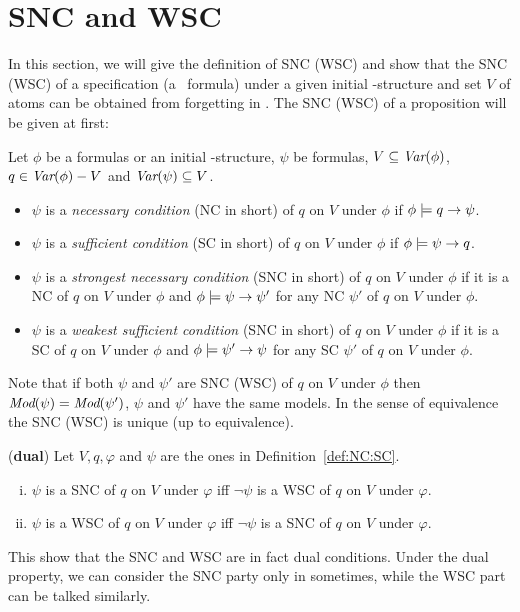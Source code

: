 \documentclass{article}
\begin{document}
\section{SNC and WSC}
In this section, we will give the definition of SNC (WSC) and show that the SNC (WSC) of a specification (a \CTL\ formula) under a given initial \MPK-structure and set $V$ of atoms can be obtained from forgetting in \CTL.
The SNC (WSC) of a proposition will be given at first:
\begin{definition}\label{def:NC:SC}
Let $\phi$ be a formulas or an initial \MPK-structure, $\psi$ be formulas, $V \subseteq \textit{Var}(\phi)$, $q\in\textit{Var}(\phi)-V$
and $\textit{Var}(\psi)\subseteq V$.
\begin{itemize}
  \item $\psi$  is a {\em necessary condition} (NC in short) of $q$ on $V$ under $\phi$
    if $\phi \models q \rightarrow \psi$.
  \item $\psi$  is a {\em sufficient condition} (SC in short) of $q$ on $V$ under $\phi$
    if $\phi \models \psi\rightarrow q$.
  \item $\psi$  is a {\em strongest necessary condition} (SNC in short)
  of $q$ on $V$ under $\phi$
    if it is a NC of $q$ on $V$ under $\phi$ and $\phi\models\psi\rightarrow\psi'$
    for any NC $\psi'$ of $q$ on $V$ under $\phi$.

    \item $\psi$  is a {\em weakest sufficient condition} (SNC in short)
  of $q$ on $V$ under $\phi$
    if it is a SC of $q$ on $V$ under $\phi$ and $\phi\models\psi'\rightarrow\psi$
    for any SC $\psi'$ of $q$ on $V$ under $\phi$.
\end{itemize}
\end{definition}
Note that if both $\psi$ and $\psi'$ are SNC (WSC) of $q$ on $V$ under $\phi$ then
$\textit{Mod}(\psi)=\textit{Mod}(\psi')$, \ie $\psi$ and $\psi'$ have the same models. In the sense
of equivalence the SNC (WSC) is unique (up to equivalence).



\begin{proposition}\label{dual}
(\textbf{dual})
 Let $V,q,\varphi$ and $\psi$ are the ones in Definition~\ref{def:NC:SC}.
 \begin{enumerate}[(i)]
   \item $\psi$ is a SNC of $q$ on $V$ under $\varphi$ iff $\neg \psi$ is a WSC
    of $q$ on $V$ under $\varphi$.
   \item $\psi$ is a WSC of $q$ on $V$ under $\varphi$ iff $\neg \psi$ is a  SNC
    of $q$ on $V$ under $\varphi$.
 \end{enumerate}
\end{proposition}
This show that the SNC and WSC are in fact dual conditions. Under the dual property, we can consider the SNC party only in sometimes, while
the WSC part can be talked similarly.
%
\end{document}
